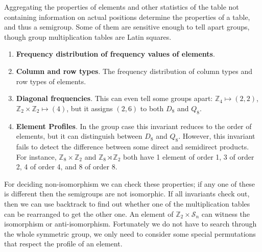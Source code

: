 \documentclass{amsart}
\newcommand{\cS}{{\mathcal S}}
\newcommand{\Z}{\mathbb{Z}}
\theoremstyle{plain}
\theoremstyle{definition}
\begin{document}
Aggregating the properties of elements and other statistics of the table not containing information on actual positions determine the properties of a table, and thus a semigroup. Some of them are sensitive enough to tell apart groups, though group multiplication tables are Latin squares.
\begin{enumerate}
\item\textbf{Frequency distribution of frequency values of elements}. %
\item\textbf{Column and row types}. The frequency distribution of column types and row types of elements. %
\item \textbf{Diagonal frequencies}. This can even tell some groups apart: $\Z_4\mapsto (2,2)$, $\Z_2\times \Z_2\mapsto (4)$, but it assigns $(2,6)$ to both $D_8$ and $Q_8$.
\item \textbf{Element Profiles}. In the group case this invariant reduces to the order of elements, but it can distinguish between $D_8$ and $Q_8$. However, this invariant fails to detect the difference between some direct and semidirect products. For instance, $\Z_8\times \Z_2$ and $\Z_8\rtimes \Z_2$ both have 1 element of order 1, 3 of order 2, 4 of order 4, and 8 of order 8.
\end{enumerate} 

For deciding non-isomorphism we can check these properties; if any one of these is different then the semigroups are not isomorphic.
If all invariants check out, then we can use backtrack to find out whether one of the multiplication tables can be rearranged to get the other one.
An element of $\Z_2\times \cS_n$ can witness the isomorphism or anti-isomorphism.
Fortunately we do not have to search through the whole symmetric group, we only need to consider some special permutations that respect the profile of an element.
\end{document}

